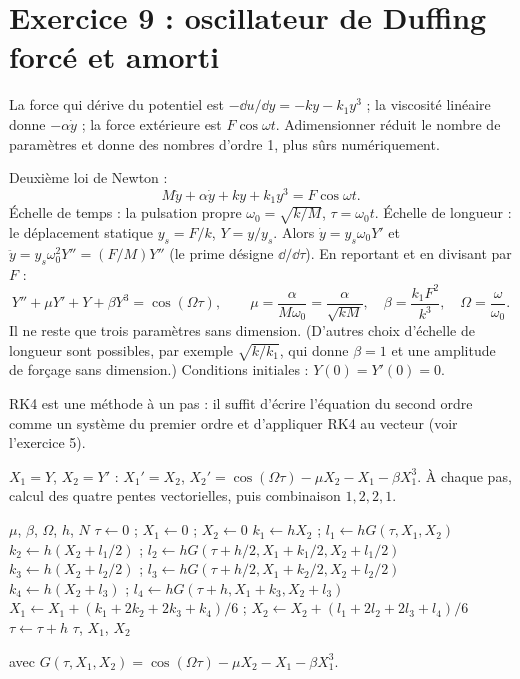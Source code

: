 \section{Exercice 9 : oscillateur de Duffing forcé et amorti}

\Pourquoi La force qui dérive du potentiel est $-\dd u/\dd y = -ky - k_1y^3$ ;
la viscosité linéaire donne $-\alpha\dot y$ ; la force extérieure est
$F\cos\omega t$. Adimensionner réduit le nombre de paramètres et donne des
nombres d'ordre 1, plus sûrs numériquement.

\Etapes
{} Deuxième loi de Newton :
\[
  M\ddot y + \alpha\dot y + ky + k_1y^3 = F\cos\omega t .
\]
 Échelle de temps : la pulsation propre $\omega_0 = \sqrt{k/M}$,
$\tau = \omega_0t$. Échelle de longueur : le déplacement statique
$y_s = F/k$, $Y = y/y_s$. Alors $\dot y = y_s\omega_0Y'$ et
$\ddot y = y_s\omega_0^2Y'' = (F/M)Y''$ (le prime désigne $\dd/\dd\tau$).
 En reportant et en divisant par $F$ :
\[
  Y'' + \mu Y' + Y + \beta Y^3 = \cos(\Omega\tau),
  \qquad \mu = \frac{\alpha}{M\omega_0} = \frac{\alpha}{\sqrt{kM}},
  \quad \beta = \frac{k_1F^2}{k^3},
  \quad \Omega = \frac{\omega}{\omega_0} .
\]
Il ne reste que trois paramètres sans dimension. (D'autres choix d'échelle de
longueur sont possibles, par exemple $\sqrt{k/k_1}$, qui donne $\beta = 1$ et
une amplitude de forçage sans dimension.) Conditions initiales :
$Y(0) = Y'(0) = 0$.

\Pourquoi RK4 est une méthode à un pas : il suffit d'écrire l'équation du second
ordre comme un système du premier ordre et d'appliquer RK4 au vecteur
(voir l'exercice 5).

 $X_1 = Y$, $X_2 = Y'$ : $X_1' = X_2$,
$X_2' = \cos(\Omega\tau) - \mu X_2 - X_1 - \beta X_1^3$.
 À chaque pas, calcul des quatre pentes vectorielles, puis combinaison
$1, 2, 2, 1$.

\begin{algo}
  \Require $\mu$, $\beta$, $\Omega$, $h$, $N$
  \State $\tau \leftarrow 0$ ; $X_1 \leftarrow 0$ ; $X_2 \leftarrow 0$
    \State $k_1 \leftarrow hX_2$ ; $l_1 \leftarrow hG(\tau, X_1, X_2)$
    \State $k_2 \leftarrow h(X_2 + l_1/2)$ ; $l_2 \leftarrow hG(\tau + h/2, X_1 + k_1/2, X_2 + l_1/2)$
    \State $k_3 \leftarrow h(X_2 + l_2/2)$ ; $l_3 \leftarrow hG(\tau + h/2, X_1 + k_2/2, X_2 + l_2/2)$
    \State $k_4 \leftarrow h(X_2 + l_3)$ ; $l_4 \leftarrow hG(\tau + h, X_1 + k_3, X_2 + l_3)$
    \State $X_1 \leftarrow X_1 + (k_1 + 2k_2 + 2k_3 + k_4)/6$ ; $X_2 \leftarrow X_2 + (l_1 + 2l_2 + 2l_3 + l_4)/6$
    \State $\tau \leftarrow \tau + h$
    \Print $\tau$, $X_1$, $X_2$
  \EndFor
\end{algo}
avec $G(\tau, X_1, X_2) = \cos(\Omega\tau) - \mu X_2 - X_1 - \beta X_1^3$.

